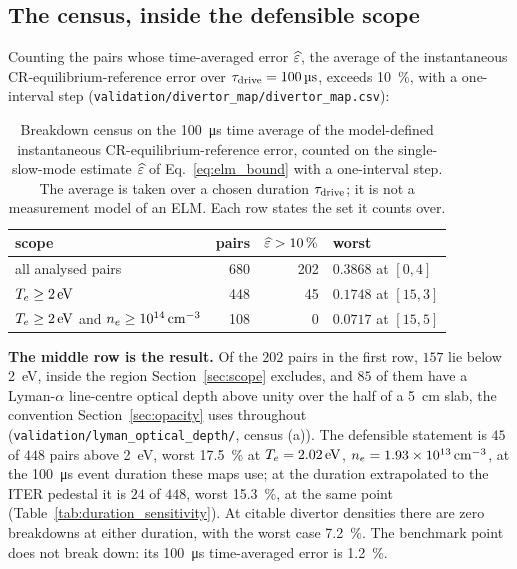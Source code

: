 \subsection{The census, inside the defensible scope}

Counting the pairs whose time-averaged error $\widehat{\varepsilon}$, the average of the
instantaneous CR-equilibrium-reference error over
$\tau_{\mathrm{drive}} = \SI{100}{\micro\second}$, exceeds \SI{10}{\percent}, with a
one-interval step
(\texttt{validation/divertor\_map/divertor\_map.csv}):

\begin{table}[htbp]
\centering
\caption{Breakdown census on the \SI{100}{\micro\second} time average of the
model-defined instantaneous CR-equilibrium-reference error, counted on the
single-slow-mode estimate $\widehat{\varepsilon}$ of Eq.~\eqref{eq:elm_bound} with a
one-interval step. The average is taken over a chosen duration $\tau_{\mathrm{drive}}$; it
is not a measurement model of an ELM. Each row states the set it counts over.}
\label{tab:elm_census}
\begin{tabular}{lrrl}
  \toprule
  scope & pairs & $\widehat{\varepsilon} >\SI{10}{\percent}$ & worst \\
  \midrule
  all analysed pairs & 680 & 202 & $0.3868$ at $[0,4]$ \\
  $T_e\ge\SI{2}{\electronvolt}$ & 448 & 45 & $0.1748$ at $[15,3]$ \\
  $T_e\ge\SI{2}{\electronvolt}$ and $n_e\ge\SI{e14}{\per\cubic\centi\metre}$
    & 108 & 0 & $0.0717$ at $[15,5]$ \\
  \bottomrule
\end{tabular}
\end{table}

\textbf{The middle row is the result.} Of the $202$ pairs in the first row,
$157$ lie below \SI{2}{\electronvolt}, inside the region
Section~\ref{sec:scope} excludes, and $85$ of them have a Lyman-$\alpha$
line-centre optical depth above unity over the half of a \SI{5}{\centi\metre}
slab, the convention Section~\ref{sec:opacity} uses throughout
(\texttt{validation/lyman\_optical\_depth/}, census (a)). The
defensible statement is $45$ of $448$ pairs above \SI{2}{\electronvolt}, worst
\SI{17.5}{\percent} at $T_e = \SI{2.02}{\electronvolt}$,
$n_e = \SI{1.93e13}{\per\cubic\centi\metre}$, at the
\SI{100}{\micro\second} event duration these maps use; at the duration
extrapolated to the ITER pedestal it is $24$ of $448$, worst
\SI{15.3}{\percent}, at the same point (Table~\ref{tab:duration_sensitivity}).
At citable divertor densities there are zero breakdowns at either duration, with
the worst case \SI{7.2}{\percent}. The
benchmark point does not break down: its \SI{100}{\micro\second} time-averaged
error is \SI{1.2}{\percent}.

